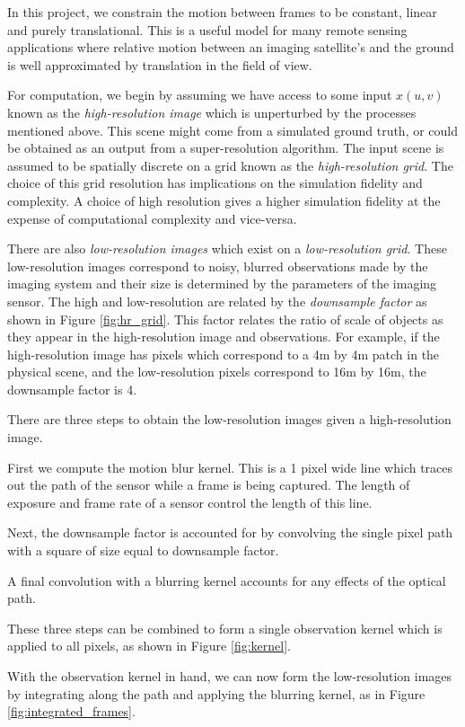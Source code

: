 \documentclass[10pt,twocolumn,letterpaper]{article}
\begin{document}
In this project, we constrain the motion between frames to be constant,  linear and purely translational.  This is a useful model for many remote sensing applications where relative motion between an imaging satellite's and the ground is well approximated by translation in the field of view.

For computation, we begin by assuming we have access to some input $x(u, v)$ known as the \emph{high-resolution image} which is unperturbed by the processes mentioned above.  This scene might come from a simulated ground truth, or could be obtained as an output from a super-resolution algorithm.  The input scene is assumed to be spatially discrete on a grid known as the \emph{high-resolution grid}.  The choice of this grid resolution has implications on the simulation fidelity and complexity.  A choice of high resolution gives a higher simulation fidelity at the expense of computational complexity and vice-versa.

There are also \emph{low-resolution images} which exist on a \emph{low-resolution grid}.  These low-resolution images correspond to noisy, blurred observations made by the imaging system and their size is determined by the parameters of the imaging sensor.  The high and low-resolution are related by the \emph{downsample factor} as shown in Figure \ref{fig:hr_grid}.
This factor relates the ratio of scale of objects as they appear in the high-resolution image and observations.  For example, if the high-resolution image has pixels which correspond to a 4m by 4m patch in the physical scene, and the low-resolution pixels correspond to 16m by 16m, the downsample factor is 4.

There are three steps to obtain the low-resolution images given a high-resolution image.

First we compute the motion blur kernel.  This is a 1 pixel wide line which traces out the  path of the sensor while a frame is being captured.  The length of exposure and frame rate of a sensor control the length of this line.

Next, the downsample factor is accounted for by convolving the single pixel path with a square of size equal to downsample factor.

A final convolution with a blurring kernel accounts for any effects of the optical path.

These three steps can be combined to form a single observation kernel which is applied to all pixels, as shown in Figure \ref{fig:kernel}.

With the observation kernel in hand, we can now form the low-resolution images by integrating along the path and applying the blurring kernel, as in Figure \ref{fig:integrated_frames}.
\end{document}
